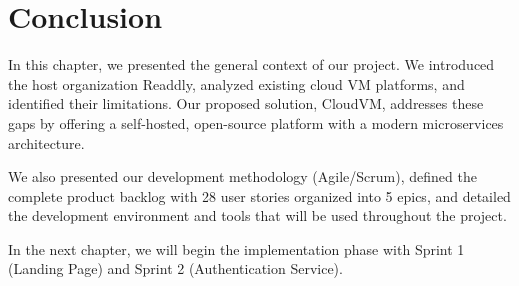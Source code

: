 \section{Conclusion}

In this chapter, we presented the general context of our project. We introduced the host organization Readdly, analyzed existing cloud VM platforms, and identified their limitations. Our proposed solution, CloudVM, addresses these gaps by offering a self-hosted, open-source platform with a modern microservices architecture.

We also presented our development methodology (Agile/Scrum), defined the complete product backlog with 28 user stories organized into 5 epics, and detailed the development environment and tools that will be used throughout the project.

In the next chapter, we will begin the implementation phase with Sprint 1 (Landing Page) and Sprint 2 (Authentication Service).
